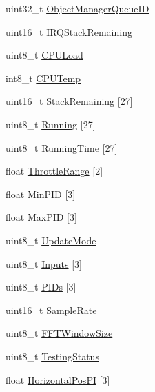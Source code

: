 \begin{DoxyCompactItemize}
uint32\-\_\-t \hyperlink{struct____attribute_____a89ea27880d9f09eb5d092599448f2305}{\-Object\-Manager\-Queue\-I\-D}
\item 
uint16\-\_\-t \hyperlink{struct____attribute_____abc3746c957b98a7cbf5ee32f39c80549}{\-I\-R\-Q\-Stack\-Remaining}
\item 
uint8\-\_\-t \hyperlink{struct____attribute_____a33dc74413b722b5c165aa2d71a9a0c62}{\-C\-P\-U\-Load}
\item 
int8\-\_\-t \hyperlink{struct____attribute_____aca4d07c062d4a97a08642fc45a3aeb4b}{\-C\-P\-U\-Temp}
\item 
uint16\-\_\-t \hyperlink{struct____attribute_____a9f4beb38be946453a859f150483b39d7}{\-Stack\-Remaining} \mbox{[}27\mbox{]}
\item 
uint8\-\_\-t \hyperlink{struct____attribute_____a976c91c5bf7b2228d24c631a50875d0c}{\-Running} \mbox{[}27\mbox{]}
\item 
uint8\-\_\-t \hyperlink{struct____attribute_____a5dd12f375763cc431ccf00ac40f64502}{\-Running\-Time} \mbox{[}27\mbox{]}
\item 
float \hyperlink{struct____attribute_____a72af498610504641e65b39b87cdcc3cf}{\-Throttle\-Range} \mbox{[}2\mbox{]}
\item 
float \hyperlink{struct____attribute_____a0868c51382bdad1829a5e6011a979e1b}{\-Min\-P\-I\-D} \mbox{[}3\mbox{]}
\item 
float \hyperlink{struct____attribute_____a72ed8cba7b9bb727955581cdead3fe32}{\-Max\-P\-I\-D} \mbox{[}3\mbox{]}
\item 
uint8\-\_\-t \hyperlink{struct____attribute_____a873aaefce940e97c425f0eb0822c8d85}{\-Update\-Mode}
\item 
uint8\-\_\-t \hyperlink{struct____attribute_____ab90a241b02b4df877fdb2c5ee6a85143}{\-Inputs} \mbox{[}3\mbox{]}
\item 
uint8\-\_\-t \hyperlink{struct____attribute_____a89822f540a972a9667f1eee62a929647}{\-P\-I\-Ds} \mbox{[}3\mbox{]}
\item 
uint16\-\_\-t \hyperlink{struct____attribute_____aea851ba15c8d4ac48cb158fddfcfbc2c}{\-Sample\-Rate}
\item 
uint8\-\_\-t \hyperlink{struct____attribute_____a44cd306f5e509bd08cb8a4d457a7636e}{\-F\-F\-T\-Window\-Size}
\item 
uint8\-\_\-t \hyperlink{struct____attribute_____acbe90d47b9a9e3b7ac93c93af8412f5d}{\-Testing\-Status}
\item 
float \hyperlink{struct____attribute_____aed9f724d8a83f86ca4561859a6be73f5}{\-Horizontal\-Pos\-P\-I} \mbox{[}3\mbox{]}

\end{DoxyCompactItemize}
